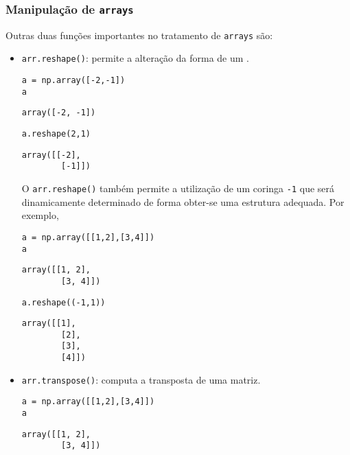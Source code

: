 \documentclass[a4paper,10pt,twoside]{article}
\begin{document}
\subsubsection{Manipulação de \texttt{arrays}}

Outras duas funções importantes no tratamento de \texttt{arrays} são:
\begin{itemize}
\item \texttt{arr.reshape()}: permite a alteração da forma de um {\PYTHONnumpyDOTarray}.
  
\begin{lstlisting}
a = np.array([-2,-1])
a
\end{lstlisting}

\begin{verbatim}
array([-2, -1])
\end{verbatim}

\begin{lstlisting}
a.reshape(2,1)
\end{lstlisting}

\begin{verbatim}
array([[-2],
        [-1]])
\end{verbatim}

O \texttt{arr.reshape()} também permite a utilização de um coringa \texttt{-1} que será dinamicamente determinado de forma obter-se uma estrutura adequada. Por exemplo,

\begin{lstlisting}
a = np.array([[1,2],[3,4]])
a
\end{lstlisting}

\begin{verbatim}
array([[1, 2],
        [3, 4]])
\end{verbatim}

\begin{lstlisting}
a.reshape((-1,1))
\end{lstlisting}

\begin{verbatim}
array([[1],
        [2],
        [3],
        [4]])
\end{verbatim}

\item \texttt{arr.transpose()}: computa a transposta de uma matriz.

\begin{lstlisting}
a = np.array([[1,2],[3,4]])
a
\end{lstlisting}

\begin{verbatim}
array([[1, 2],
        [3, 4]])
\end{verbatim}


\end{itemize}
\end{document}
